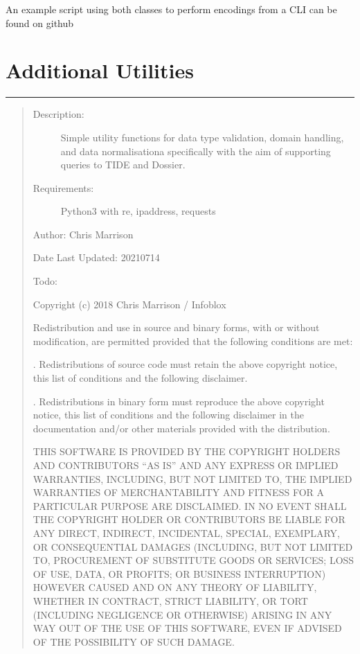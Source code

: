\documentclass[letterpaper,10pt,english]{sphinxmanual}
\begin{document}
\sphinxAtStartPar
An example script using both classes to perform encodings from a CLI
can be found on github


\chapter{Additional Utilities}
\label{\detokenize{utils:module-bloxone.utils}}\label{\detokenize{utils:additional-utilities}}\label{\detokenize{utils::doc}}

\bigskip\hrule\bigskip

\begin{quote}
\begin{description}
\item[{Description:}] \leavevmode
\sphinxAtStartPar
Simple utility functions for data type validation, domain handling,
and data normalisationa specifically with the aim of supporting
queries to TIDE and Dossier.

\item[{Requirements:}] \leavevmode
\sphinxAtStartPar
Python3 with re, ipaddress, requests

\end{description}

\sphinxAtStartPar
Author: Chris Marrison

\sphinxAtStartPar
Date Last Updated: 20210714

\sphinxAtStartPar
Todo:

\sphinxAtStartPar
Copyright (c) 2018 Chris Marrison / Infoblox

\sphinxAtStartPar
Redistribution and use in source and binary forms,
with or without modification, are permitted provided
that the following conditions are met:

. Redistributions of source code must retain the above copyright
notice, this list of conditions and the following disclaimer.

. Redistributions in binary form must reproduce the above copyright
notice, this list of conditions and the following disclaimer in the
documentation and/or other materials provided with the distribution.

\sphinxAtStartPar
THIS SOFTWARE IS PROVIDED BY THE COPYRIGHT HOLDERS AND CONTRIBUTORS
“AS IS” AND ANY EXPRESS OR IMPLIED WARRANTIES, INCLUDING, BUT NOT
LIMITED TO, THE IMPLIED WARRANTIES OF MERCHANTABILITY AND FITNESS
FOR A PARTICULAR PURPOSE ARE DISCLAIMED. IN NO EVENT SHALL THE
COPYRIGHT HOLDER OR CONTRIBUTORS BE LIABLE FOR ANY DIRECT, INDIRECT,
INCIDENTAL, SPECIAL, EXEMPLARY, OR CONSEQUENTIAL DAMAGES (INCLUDING,
BUT NOT LIMITED TO, PROCUREMENT OF SUBSTITUTE GOODS OR SERVICES;
LOSS OF USE, DATA, OR PROFITS; OR BUSINESS INTERRUPTION) HOWEVER
CAUSED AND ON ANY THEORY OF LIABILITY, WHETHER IN CONTRACT, STRICT
LIABILITY, OR TORT (INCLUDING NEGLIGENCE OR OTHERWISE) ARISING IN
ANY WAY OUT OF THE USE OF THIS SOFTWARE, EVEN IF ADVISED OF THE
POSSIBILITY OF SUCH DAMAGE.
\end{quote}
\end{document}
